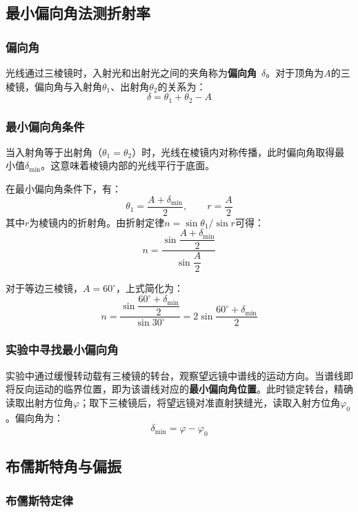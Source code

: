 \documentclass[UTF8]{article}
\begin{document}
\subsection{最小偏向角法测折射率}

\subsubsection{偏向角}

光线通过三棱镜时，入射光和出射光之间的夹角称为\textbf{偏向角}~$\delta$。对于顶角为$A$的三棱镜，偏向角与入射角$\theta_1$、出射角$\theta_2$的关系为：
\[
\delta = \theta_1 + \theta_2 - A
\]

\subsubsection{最小偏向角条件}

当入射角等于出射角（$\theta_1 = \theta_2$）时，光线在棱镜内对称传播，此时偏向角取得最小值$\delta_{\min}$。这意味着棱镜内部的光线平行于底面。

在最小偏向角条件下，有：
\[
\theta_1 = \frac{A + \delta_{\min}}{2}, \qquad r = \frac{A}{2}
\]
其中$r$为棱镜内的折射角。由折射定律$n = \sin\theta_1 / \sin r$可得：
\begin{equation}
\boxed{n = \frac{\sin\dfrac{A + \delta_{\min}}{2}}{\sin\dfrac{A}{2}}}
\label{eq:n-min-dev}
\end{equation}

对于等边三棱镜，$A = 60^\circ$，上式简化为：
\[
n = \frac{\sin\dfrac{60^\circ + \delta_{\min}}{2}}{\sin 30^\circ} = 2\sin\dfrac{60^\circ + \delta_{\min}}{2}
\]

\subsubsection{实验中寻找最小偏向角}

实验中通过缓慢转动载有三棱镜的转台，观察望远镜中谱线的运动方向。当谱线即将反向运动的临界位置，即为该谱线对应的\textbf{最小偏向角位置}。此时锁定转台，精确读取出射方位角$\varphi$；取下三棱镜后，将望远镜对准直射狭缝光，读取入射方位角$\varphi_0$。偏向角为：
\[
\delta_{\min} = \varphi - \varphi_0
\]

\subsection{布儒斯特角与偏振}

\subsubsection{布儒斯特定律}
\end{document}
